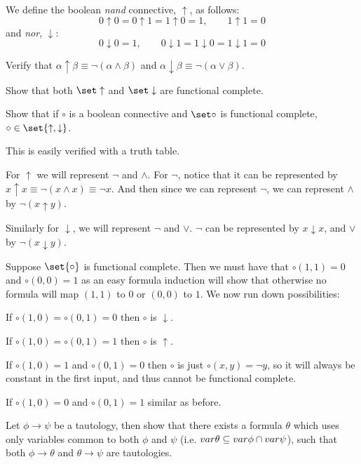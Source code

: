 \bprob

    We define the boolean {\it nand} connective, $\uparrow$, as follows:
    $$ 0\uparrow0 = 0\uparrow1 = 1\uparrow0 = 1,\qquad 1\uparrow1 = 0 $$
    and {\it nor}, $\downarrow$:
    $$ 0\downarrow0 = 1,\qquad 0\downarrow1 = 1\downarrow0 = 1\downarrow1 = 0 $$
    \benum
        \item Verify that $\alpha\uparrow\beta\equiv\neg(\alpha\land\beta)$ and
        $\alpha\downarrow\beta\equiv\neg(\alpha\lor\beta)$.
        \item Show that both $\set\uparrow$ and $\set\downarrow$ are functional complete.
        \item Show that if $\circ$ is a boolean connective and $\set\circ$ is functional
        complete, $\circ\in\set{\uparrow,\downarrow}$.
    \eenum

\eprob

\benum
    \item This is easily verified with a truth table.
    \item For $\uparrow$ we will represent $\neg$ and $\land$.
    For $\neg$, notice that it can be represented by $x\uparrow x\equiv\neg(x\land x)\equiv\neg x$.
    And then since we can represent $\neg$, we can represent $\land$ by $\neg(x\uparrow y)$.

    Similarly for $\downarrow$, we will represent $\neg$ and $\lor$.
    $\neg$ can be represented by $x\downarrow x$, and $\lor$ by $\neg(x\downarrow y)$.
    \item Suppose $\set{\circ}$ is functional complete.
    Then we must have that ${\circ}(1,1)=0$ and ${\circ}(0,0)=1$ as an easy formula induction will show that otherwise no formula will map $(1,1)$ to $0$ or $(0,0)$ to $1$.
    We now run down possibilities:
    \benum
        \item If ${\circ}(1,0)={\circ}(0,1)=0$ then $\circ$ is $\downarrow$.
        \item If ${\circ}(1,0)={\circ}(0,1)=1$ then $\circ$ is $\uparrow$.
        \item If ${\circ}(1,0)=1$ and ${\circ}(0,1)=0$ then ${\circ}$ is just ${\circ}(x,y)=\neg y$, so it will always be constant in the first input, and thus cannot be functional complete.
        \item If ${\circ}(1,0)=0$ and ${\circ}(0,1)=1$ similar as before.
    \eenum
\eenum

\bprob

    Let $\phi\to\psi$ be a tautology, then show that there exists a formula $\theta$ which uses
    only variables common to both $\phi$ and $\psi$ (i.e.
    ${\sl var}\theta\subseteq{\sl var}\phi\cap{\sl var}\psi$), such that both $\phi\to\theta$ and $\theta\to\psi$
    are tautologies.

